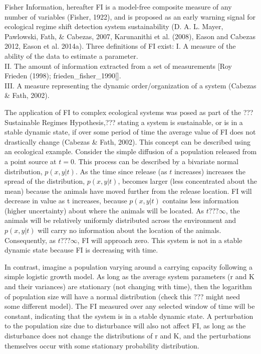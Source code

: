 \documentclass[12pt,twoside,openany]{reedthesis}
\begin{document}
Fisher Information, hereafter FI is a model-free composite measure of
any number of variables (Fisher, 1922), and is proposed as an early
warning signal for ecological regime shift detection system
sustainability (D. A. L. Mayer, Pawlowski, Fath, \& Cabezas, 2007,
Karunanithi et al. (2008), Eason and Cabezas 2012, Eason et al. 2014a).
Three definitions of FI exist: I. A measure of the ability of the data
to estimate a parameter.\\
II. The amount of information extracted from a set of measurements
{[}Roy Frieden (1998); frieden\_fisher\_1990{[}{]}.\\
III. A measure representing the dynamic order/organization of a system
(Cabezas \& Fath, 2002).

The application of FI to complex ecological systems was posed as part of
the ???Sustainable Regimes Hypothesis,??? stating a system is
sustainable, or is in a stable dynamic state, if over some period of
time the average value of FI does not drastically change (Cabezas \&
Fath, 2002). This concept can be described using an ecological example.
Consider the simple diffusion of a population released from a point
source at \(t = 0\). This process can be described by a bivariate normal
distribution, \(p(x,y\vert t)\). As the time since release (as \(t\)
increases) increases the spread of the distribution, \(p(x,y\vert t)\),
becomes larger (less concentrated about the mean) because the animals
have moved further from the release location. FI will decrease in value
as t increases, because \(p(x,y\vert t)\) contains less information
(higher uncertainty) about where the animals will be located. As
\(t???\infty\), the animals will be relatively uniformly distributed
across the environment and \(p(x,y\vert t)\) will carry no information
about the location of the animals. Consequently, as \(t???\infty\), FI
will approach zero. This system is not in a stable dynamic state because
FI is decreasing with time.

In contrast, imagine a population varying around a carrying capacity
following a simple logistic growth model. As long as the average system
parameters (r and K and their variances) are stationary (not changing
with time), then the logarithm of population size will have a normal
distribution (check this ??? might need some different model). The FI
measured over any selected window of time will be constant, indicating
that the system is in a stable dynamic state. A perturbation to the
population size due to disturbance will also not affect FI, as long as
the disturbance does not change the distributions of r and K, and the
perturbations themselves occur with some stationary probability
distribution.
\end{document}
